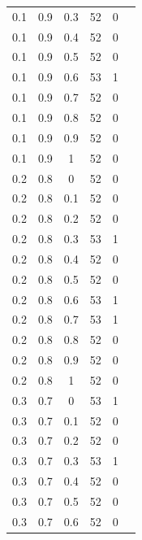 \documentclass[12pt]{report}
\begin{document}
\begin{table}
\begin{minipage}[h!]{0.10\hsize}
\begin{center}
{\begin{tabular}{|c@{\hspace{5mm}}|c@{\hspace{5mm}}|c@{\hspace{5mm}}|c@{\hspace{5mm}}|c@{\hspace{5mm}}|c|}
                    0.1  & 0.9  & 0.3  & 52    & 0     \\
                    0.1  & 0.9  & 0.4  & 52    & 0     \\
                    0.1  & 0.9  & 0.5  & 52    & 0     \\
                    0.1  & 0.9  & 0.6  & 53    & 1     \\
                    0.1  & 0.9  & 0.7  & 52    & 0     \\
                    0.1  & 0.9  & 0.8  & 52    & 0     \\
                    0.1  & 0.9  & 0.9  & 52    & 0     \\
                    0.1  & 0.9  & 1    & 52    & 0     \\
                    0.2  & 0.8  & 0    & 52    & 0     \\
                    0.2  & 0.8  & 0.1  & 52    & 0     \\
                    0.2  & 0.8  & 0.2  & 52    & 0     \\
                    0.2  & 0.8  & 0.3  & 53    & 1     \\
                    0.2  & 0.8  & 0.4  & 52    & 0     \\
                    0.2  & 0.8  & 0.5  & 52    & 0     \\
                    0.2  & 0.8  & 0.6  & 53    & 1     \\
                    0.2  & 0.8  & 0.7  & 53    & 1     \\
                    0.2  & 0.8  & 0.8  & 52    & 0     \\
                    0.2  & 0.8  & 0.9  & 52    & 0     \\
                    0.2  & 0.8  & 1    & 52    & 0     \\
                    0.3  & 0.7  & 0    & 53    & 1     \\
                    0.3  & 0.7  & 0.1  & 52    & 0     \\
                    0.3  & 0.7  & 0.2  & 52    & 0     \\
                    0.3  & 0.7  & 0.3  & 53    & 1     \\
                    0.3  & 0.7  & 0.4  & 52    & 0     \\
                    0.3  & 0.7  & 0.5  & 52    & 0     \\
                    0.3  & 0.7  & 0.6  & 52    & 0     \\
                \end{tabular}}

\end{center}
\end{minipage}
\end{table}
\end{document}
